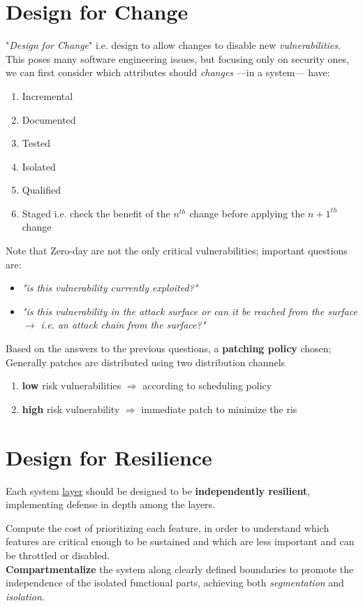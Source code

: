 \section{Design for Change}

"\textit{Design for Change}" i.e. design to allow changes to disable new \textit{vulnerabilities}.
This poses many software engineering issues, but focusing only on security ones,
we can first consider which attributes should \textit{changes} {---}in a system{---} have:
\begin{enumerate}
   \item Incremental
   \item Documented
   \item Tested
   \item Isolated
   \item Qualified
   \item Staged i.e. check the benefit of the $n^{th}$ change before applying the
   $n+1^{th}$ change
\end{enumerate}

Note that Zero-day are not the only critical vulnerabilities;
important questions are:
\begin{itemize}
   \item \textit{"is this vulnerability currently exploited?"}
   \item \textit{"is this vulnerability in the attack surface or can it be reached from the surface $\longrightarrow$ i.e. an attack chain from the surface?"}
\end{itemize}
Based on the answers to the previous questions, a \textbf{patching policy} chosen;
Generally patches are distributed using two distribution channels
\begin{enumerate}
   \item \textbf{low} risk vulnerabilities $\Rightarrow$ according to scheduling policy
   \item \textbf{high} risk vulnerability $\Rightarrow$ immediate patch to minimize the ris
\end{enumerate}

\section{Design for Resilience}

Each system \ul{layer} should be designed to be \textbf{independently resilient}, implementing defense in depth among the
layers.

Compute the cost of prioritizing each feature, in order to understand which features are critical
enough to be sustained and which are less important and can be throttled or disabled.\\
\textbf{Compartmentalize} the system along clearly defined boundaries to promote the
independence of the isolated functional parts, achieving both \textit{segmentation} and \textit{isolation}.

